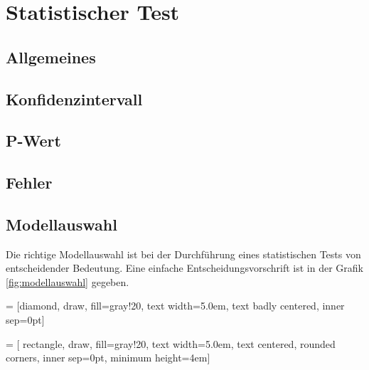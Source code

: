 



\chapter{Statistischer Test}

\newpage
\section{Allgemeines}
\section{Konfidenzintervall}
\section{P-Wert}
\section{Fehler}

\clearpage
\newpage
\section{Modellauswahl}
Die richtige Modellauswahl ist bei der Durchführung eines statistischen
Tests von entscheidender Bedeutung. Eine einfache Entscheidungsvorschrift
ist in der Grafik \ref{fig:modellauswahl} gegeben.

 = [diamond, 
			draw, 
			fill=gray!20, 
			text width=5.0em, 
			text badly centered, 
			inner sep=0pt]

 = [	rectangle, 
			draw, 
			fill=gray!20, 
			text width=5.0em, 
			text centered, 
			rounded corners,
			inner sep=0pt,
			minimum height=4em]

